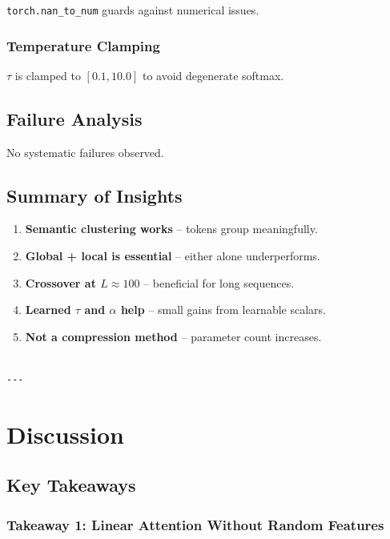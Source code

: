 \texttt{torch.nan\_to\_num} guards against numerical issues.

\subsubsection{Temperature Clamping}

$\tau$ is clamped to $[0.1, 10.0]$ to avoid degenerate softmax.

\subsection{Failure Analysis}

No systematic failures observed.

\subsection{Summary of Insights}

\begin{enumerate}
\item \textbf{Semantic clustering works} -- tokens group meaningfully.
\item \textbf{Global + local is essential} -- either alone underperforms.
\item \textbf{Crossover at $L \approx 100$} -- beneficial for long sequences.
\item \textbf{Learned $\tau$ and $\alpha$ help} -- small gains from learnable scalars.
\item \textbf{Not a compression method} -- parameter count increases.
\end{enumerate}
\begin{lstlisting}

---
\end{lstlisting}

\section{Discussion}

\subsection{Key Takeaways}

\subsubsection{Takeaway 1: Linear Attention Without Random Features}

